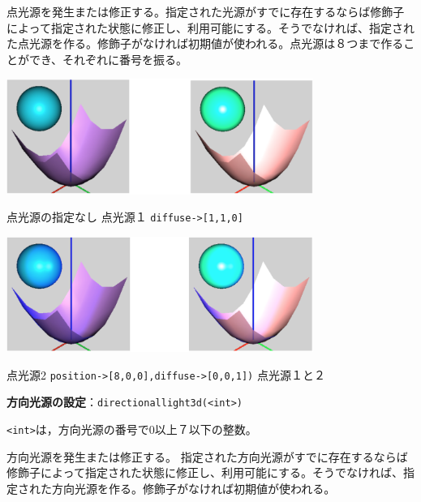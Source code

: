 \documentclass[papersize,a4paper,12pt,uplatex]{jsarticle}
\begin{document}
点光源を発生または修正する。指定された光源がすでに存在するならば修飾子によって指定された状態に修正し、利用可能にする。そうでなければ、指定された点光源を作る。修飾子がなければ初期値が使われる。点光源は８つまで作ることができ、それぞれに番号を振る。

\vspace{\baselineskip}
 

\vspace{\baselineskip}
\hspace{15mm} \includegraphics[bb=0 0 572 216 , width=10cm]{Cfig/light1.png}

\hspace{25mm}点光源の指定なし \hspace{20mm} 点光源１ \verb|diffuse->[1,1,0]|

\vspace{\baselineskip}
\hspace{15mm} \includegraphics[bb=0 0 572 215 , width=10cm]{Cfig/light2.png}

\hspace{5mm}点光源2 \verb|position->[8,0,0],diffuse->[0,0,1])| \hspace{5mm} 点光源１と２

\hypertarget{directionallight3d}{}
\vspace{\baselineskip}
\noindent
{\bf 方向光源の設定}：\verb|directionallight3d(<int>)|

\verb|<int>|は，方向光源の番号で0以上７以下の整数。

方向光源を発生または修正する。 指定された方向光源がすでに存在するならば修飾子によって指定された状態に修正し、利用可能にする。そうでなければ、指定された方向光源を作る。修飾子がなければ初期値が使われる。
\end{document}

